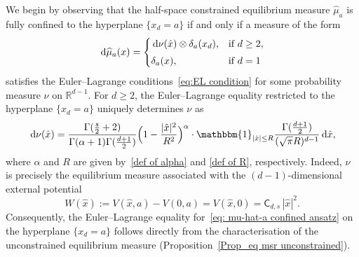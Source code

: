 \documentclass{amsart}
\def\R{\mathbb{R}}
\newcommand{\ud}{\, \mathrm{d}}
\theoremstyle{plain}
\theoremstyle{remark}
\numberwithin{equation}{section}
\begin{document}
We begin by observing that the half-space constrained equilibrium measure
$\widehat{\mu}_a$ is fully confined to the hyperplane $\{x_d=a\}$ if and
only if a measure of the form
\begin{equation} \label{eq: mu-hat-a confined ansatz}
    \ud \widehat\mu_a(x) = \begin{cases}
        \ud \nu(\hat x) \otimes \delta_a(x_d), & \text{if } d \geq 2,
        \smallskip 
        \\
        \delta_a(x), & \text{if } d =1
    \end{cases}
\end{equation}
satisfies the Euler--Lagrange conditions~\eqref{eq:EL condition} for some
probability measure $\nu$ on $\R^{d-1}$. 
For $d\ge2$, the Euler--Lagrange equality restricted to the hyperplane
$\{x_d=a\}$ uniquely determines $\nu$ as 
\begin{equation} \label{eq: ansatz measure nu}
    \ud \nu(\hat x) = \frac{\Gamma(\frac{s}{2}+2)}{\Gamma(\alpha+1)\Gamma(\frac{d+1}{2})}\Big(1-\frac{|\hat x|^2}{R^2}\Big)^{\alpha} \cdot \mathbbm{1}_{|\hat x|\le R} \frac{\Gamma(\frac{d+1}{2})}{(\sqrt{\pi}R)^{d-1}}\ud \hat x,
\end{equation}
where $\alpha$ and $R$ are given by~\eqref{def of alpha} and
\eqref{def of R}, respectively. Indeed, $\nu$ is precisely the
equilibrium measure associated with the $(d-1)$-dimensional external
potential 
\begin{equation}
    W(\hat{x}) := V(\hat x,a)-V(0,a) = V(\hat x,0)= \mathsf{C}_{d,s} \, |\hat x|^2.
\end{equation}
Consequently, the Euler--Lagrange equality for~\eqref{eq: mu-hat-a confined ansatz} on the hyperplane $\{x_d=a\}$ follows directly from the characterisation of the unconstrained equilibrium measure (Proposition~\ref{Prop_eq msr unconstrained}).
\end{document}
